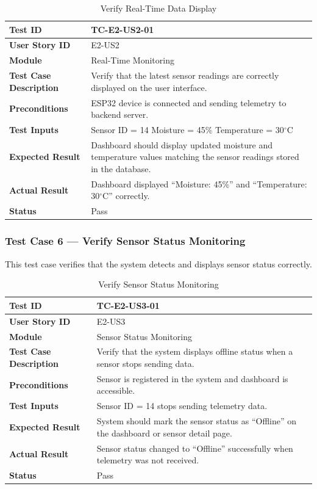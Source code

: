 \begin{longtable}{|p{4cm}|p{8cm}|}
\caption{Verify Real-Time Data Display}
\label{tab:tc_realtime} \\
\hline
\textbf{Test ID} & TC-E2-US2-01 \\ \hline
\textbf{User Story ID} & E2-US2 \\ \hline
\textbf{Module} & Real-Time Monitoring \\ \hline
\textbf{Test Case Description} & Verify that the latest sensor 
readings are correctly displayed on the user interface. \\ \hline
\textbf{Preconditions} & ESP32 device is connected and sending 
telemetry to backend server. \\ \hline
\textbf{Test Inputs} &
Sensor ID = 14 \newline
Moisture = 45\% \newline
Temperature = 30$^{\circ}$C \\ \hline
\textbf{Expected Result} & Dashboard should display updated moisture 
and temperature values matching the sensor readings stored in the 
database. \\ \hline
\textbf{Actual Result} & Dashboard displayed ``Moisture: 45\%'' and 
``Temperature: 30$^{\circ}$C'' correctly. \\ \hline
\textbf{Status} & Pass \\ \hline
\end{longtable}

\subsubsection{Test Case 6 --- Verify Sensor Status Monitoring}

This test case verifies that the system detects and displays sensor 
status correctly.

\begin{longtable}{|p{4cm}|p{8cm}|}
\caption{Verify Sensor Status Monitoring}
\label{tab:tc_sensor_status} \\
\hline
\textbf{Test ID} & TC-E2-US3-01 \\ \hline
\textbf{User Story ID} & E2-US3 \\ \hline
\textbf{Module} & Sensor Status Monitoring \\ \hline
\textbf{Test Case Description} & Verify that the system displays 
offline status when a sensor stops sending data. \\ \hline
\textbf{Preconditions} & Sensor is registered in the system and 
dashboard is accessible. \\ \hline
\textbf{Test Inputs} & Sensor ID = 14 stops sending telemetry 
data. \\ \hline
\textbf{Expected Result} & System should mark the sensor status as 
``Offline'' on the dashboard or sensor detail page. \\ \hline
\textbf{Actual Result} & Sensor status changed to ``Offline'' 
successfully when telemetry was not received. \\ \hline
\textbf{Status} & Pass \\ \hline
\end{longtable}


